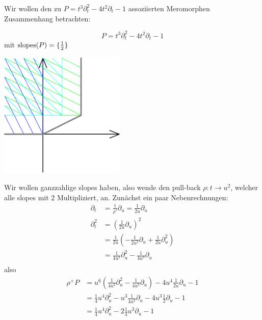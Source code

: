 \begin{exmp}
  Wir wollen den zu $P= t^3\partial_t^2-4t^2\partial_t-1$ assoziierten
  Meromorphen Zusammenhang
  betrachten:\\
  \begin{minipage}[hbt]{0,39\textwidth}
    \[ P= t^3\partial_t^2-4t^2\partial_t-1 \]
    mit $ \operatorname{slopes}(P)=\{\frac{1}{2}\} $
  \end{minipage}
  \begin{minipage}[hbt]{0,59\textwidth}
    \begin{center}
      \includegraphics[width=6cm]{img/formal_b.png}
    \end{center}
  \end{minipage}
  Wir wollen ganzzahlige slopes haben, also wende den pull-back
  $\rho:t\rightarrow u^2$, welcher alle slopes mit 2 Multipliziert,
  an.
  Zunächst ein paar Nebenrechnungen: 
  \begin{align*}
    \partial_t   &= \frac{1}{\rho'}\partial_u=\frac{1}{2u}\partial_u \\
    \partial_t^2 &= (\frac{1}{2u}\partial_u)^2\\
                 &= \frac{1}{2u}(-\frac{1}{2u^2}\partial_u + 
                   \frac{1}{2u}\partial_u^2) \\
                 &= \frac{1}{4u^2}\partial_u^2-\frac{1}{4u^3}\partial_u \\
  \end{align*}
  also
  \begin{align*}
    \rho^+P &= u^6(\frac{1}{4u^2}\partial_u^2-\frac{1}{4u^3}\partial_u)- 
              4u^{4}\frac{1}{2u}\partial_u-1\\
            &= \frac{1}{4}u^4\partial_u^2-u^3\frac{1}{4u^3}\partial_u-
              4u^{3}\frac{1}{2}\partial_u-1\\
            &= \frac{1}{4}u^4\partial_u^2 -2\frac{1}{4}u^3\partial_u-1
  \end{align*}


\end{exmp}
